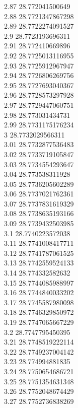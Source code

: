 {2.87	28.772041500649\\
2.88	28.7721347867298\\
2.89	28.7722274091527\\
2.9	28.7723193696311\\
2.91	28.772410669896\\
2.92	28.7725013116955\\
2.93	28.7725912967947\\
2.94	28.7726806269756\\
2.95	28.7727693040367\\
2.96	28.7728573297928\\
2.97	28.7729447060751\\
2.98	28.773031434731\\
2.99	28.7731175176234\\
3	28.7732029566311\\
3.01	28.7732877536483\\
3.02	28.7733719105847\\
3.03	28.7734554293647\\
3.04	28.773538311928\\
3.05	28.7736205602289\\
3.06	28.7737021762361\\
3.07	28.7737831619329\\
3.08	28.7738635193166\\
3.09	28.7739432503985\\
3.1	28.7740223572038\\
3.11	28.7741008417711\\
3.12	28.7741787061525\\
3.13	28.7742559524133\\
3.14	28.774332582632\\
3.15	28.7744085988997\\
3.16	28.7744840033202\\
3.17	28.7745587980098\\
3.18	28.7746329850972\\
3.19	28.7747065667229\\
3.2	28.7747795450395\\
3.21	28.7748519222114\\
3.22	28.7749237004142\\
3.23	28.774994881835\\
3.24	28.7750654686721\\
3.25	28.7751354631348\\
3.26	28.7752048674429\\
3.27	28.7752736838269\\
}
